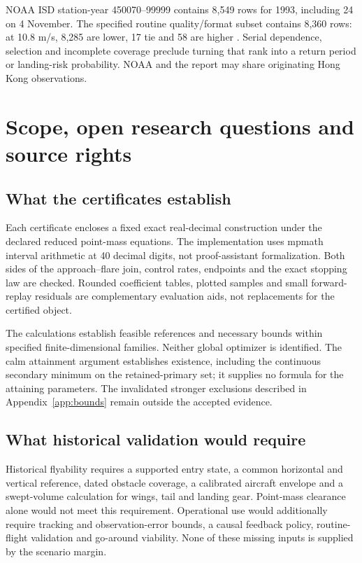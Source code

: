 NOAA ISD station-year 450070--99999 contains 8,549 rows for 1993, including 24 on 4 November. The specified routine quality/format subset contains 8,360 rows: at 10.8 m/s, 8,285 are lower, 17 tie and 58 are higher \citep{noaa,isd}. Serial dependence, selection and incomplete coverage preclude turning that rank into a return period or landing-risk probability. NOAA and the report may share originating Hong Kong observations.

\section{Scope, open research questions and source rights}\label{app:scope}
\subsection*{What the certificates establish}
Each certificate encloses a fixed exact real-decimal construction under the declared reduced point-mass equations. The implementation uses mpmath interval arithmetic at 40 decimal digits, not proof-assistant formalization. Both sides of the approach--flare join, control rates, endpoints and the exact stopping law are checked. Rounded coefficient tables, plotted samples and small forward-replay residuals are complementary evaluation aids, not replacements for the certified object.

The calculations establish feasible references and necessary bounds within specified finite-dimensional families. Neither global optimizer is identified. The calm attainment argument establishes existence, including the continuous secondary minimum on the retained-primary set; it supplies no formula for the attaining parameters. The invalidated stronger exclusions described in Appendix~\ref{app:bounds} remain outside the accepted evidence.

\subsection*{What historical validation would require}
Historical flyability requires a supported entry state, a common horizontal and vertical reference, dated obstacle coverage, a calibrated aircraft envelope and a swept-volume calculation for wings, tail and landing gear. Point-mass clearance alone would not meet this requirement. Operational use would additionally require tracking and observation-error bounds, a causal feedback policy, routine-flight validation and go-around viability. None of these missing inputs is supplied by the scenario margin.


